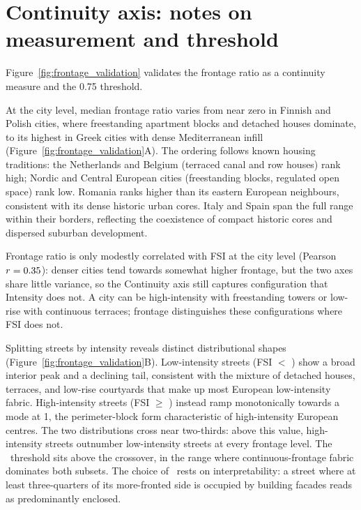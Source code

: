 \documentclass[review,authoryear]{elsarticle}
\begin{document}
\section{Continuity axis: notes on measurement and threshold}
\label{sec:continuity-calibration}

Figure~\ref{fig:frontage_validation} validates the frontage ratio as a continuity measure and the 0.75 threshold.

At the city level, median frontage ratio varies from near zero in Finnish and Polish cities, where freestanding apartment blocks and detached houses dominate, to its highest in Greek cities with dense Mediterranean infill (Figure~\ref{fig:frontage_validation}A). The ordering follows known housing traditions: the Netherlands and Belgium (terraced canal and row houses) rank high; Nordic and Central European cities (freestanding blocks, regulated open space) rank low. Romania ranks higher than its eastern European neighbours, consistent with its dense historic urban cores. Italy and Spain span the full range within their borders, reflecting the coexistence of compact historic cores and dispersed suburban development.

Frontage ratio is only modestly correlated with FSI at the city level (Pearson $r = 0.35$): denser cities tend towards somewhat higher frontage, but the two axes share little variance, so the Continuity axis still captures configuration that Intensity does not. A city can be high-intensity with freestanding towers or low-rise with continuous terraces; frontage distinguishes these configurations where FSI does not.

Splitting streets by intensity reveals distinct distributional shapes (Figure~\ref{fig:frontage_validation}B). Low-intensity streets (FSI $<$ \threshFSI) show a broad interior peak and a declining tail, consistent with the mixture of detached houses, terraces, and low-rise courtyards that make up most European low-intensity fabric. High-intensity streets (FSI $\geq$ \threshFSI) instead ramp monotonically towards a mode at 1, the perimeter-block form characteristic of high-intensity European centres. The two distributions cross near two-thirds: above this value, high-intensity streets outnumber low-intensity streets at every frontage level. The \threshCont\ threshold sits above the crossover, in the range where continuous-frontage fabric dominates both subsets. The choice of \threshCont\ rests on interpretability: a street where at least three-quarters of its more-fronted side is occupied by building facades reads as predominantly enclosed.
\end{document}
